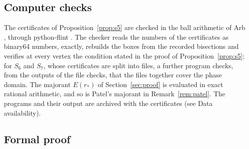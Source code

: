 \documentclass[11pt]{amsart}
\theoremstyle{remark}
\numberwithin{equation}{section}
\begin{document}
\subsection{Computer checks}\label{sec:compchecks}
The certificates of Proposition~\ref{prop:s5} are checked in the ball arithmetic of Arb \cite{Joh17}, through python-flint \cite{pyflint}. The checker reads the numbers of the certificates as binary64 numbers, exactly, rebuilds the boxes from the recorded bisections and verifies at every vertex the condition stated in the proof of Proposition~\ref{prop:s5}; for $S_6$ and $S_7$, whose certificates are split into files, a further program checks, from the outputs of the file checks, that the files together cover the phase domain. The majorant $E(r_*)$ of Section~\ref{sec:proof} is evaluated in exact rational arithmetic, and so is Patel's majorant in Remark~\ref{rem:patel}. The programs and their output are archived with the certificates (see Data availability).

\subsection{Formal proof}\label{sec:lean}
\end{document}
